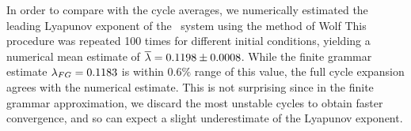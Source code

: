In order to compare with the cycle averages, we numerically estimated the
leading Lyapunov exponent of the \twomode\ system using the method of
Wolf \etal{} This procedure was repeated 100 times for
different initial conditions, yielding a numerical mean estimate of
$\overline{\lambda} = 0.1198 \pm 0.0008$. While the finite grammar
estimate $\lambda_{FG} = 0.1183$ is within $0.6\%$ range of this value,
the full cycle expansion agrees with the numerical estimate. This is not
surprising since in the finite grammar approximation, we discard the
most unstable cycles to obtain faster convergence, and so can expect 
a slight underestimate of the Lyapunov exponent.


\renewcommand{\zeit}{\ensuremath{\tau}}  %
